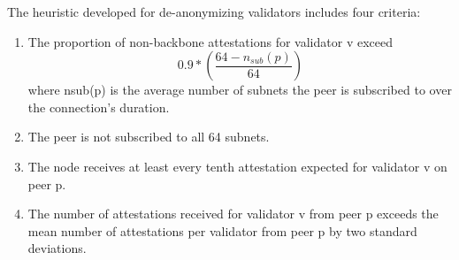 The heuristic developed for de-anonymizing validators includes four criteria:
\begin{enumerate}
    \item The proportion of non-backbone attestations for validator v exceed
    \begin{equation}
        0.9*\left(\frac{64-n_{sub}(p)}{64}\right)
        \label{eq:heurestic}
    \end{equation} where nsub(p) is the average number of subnets the peer is subscribed to over the connection’s duration.
    \item The peer is not subscribed to all 64 subnets.
    \item The node receives at least every tenth attestation expected for validator v on peer p.
    \item The number of attestations received for validator v from peer p exceeds the mean number of attestations per validator from peer p by two standard deviations.
\end{enumerate}